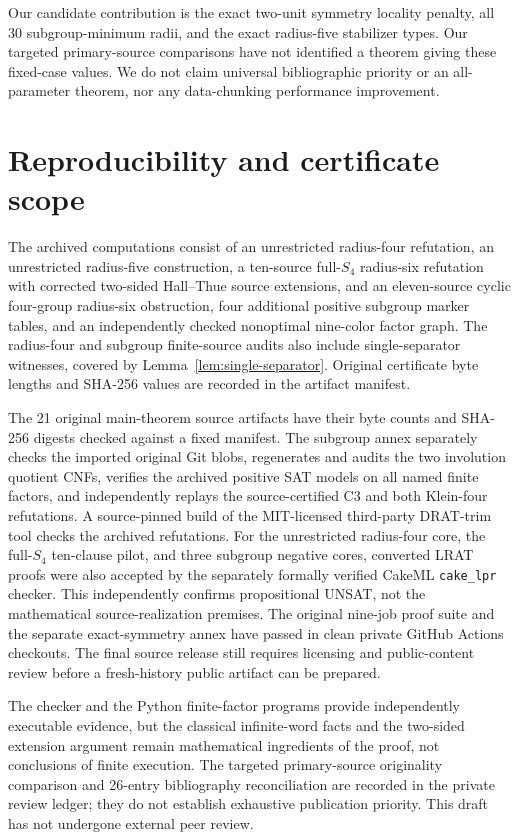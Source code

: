 \documentclass[11pt]{article}
\theoremstyle{remark}
\newcommand{\Sym}{S_4}
\begin{document}
Our candidate contribution is the exact
two-unit symmetry locality penalty,
all 30 subgroup-minimum radii, and
the exact radius-five stabilizer types.
Our targeted primary-source comparisons
have not identified a theorem giving
these fixed-case values. We do not claim
universal bibliographic priority or an
all-parameter theorem, nor any
data-chunking performance improvement.

\section{Reproducibility and certificate scope}

The archived computations consist of an unrestricted
radius-four refutation, an unrestricted radius-five
construction, a ten-source full-$\Sym$ radius-six refutation
with corrected two-sided Hall--Thue source extensions, and
an eleven-source cyclic four-group radius-six
obstruction, four additional positive subgroup
marker tables, and an independently checked
nonoptimal nine-color factor graph. The
radius-four and subgroup finite-source audits also include
single-separator witnesses, covered by
Lemma~\ref{lem:single-separator}. Original
certificate byte lengths and SHA-256 values are recorded in
the artifact manifest.

The 21 original main-theorem source artifacts have their
byte counts and SHA-256 digests checked against a fixed manifest.
The subgroup annex separately checks the imported original Git blobs,
regenerates and audits the two involution quotient CNFs, verifies the
archived positive SAT models on all named finite factors, and
independently replays the source-certified C3 and both Klein-four
refutations. A source-pinned build of the MIT-licensed third-party
DRAT-trim tool checks the archived refutations.
For the unrestricted radius-four core, the full-$S_4$
ten-clause pilot, and three subgroup negative cores,
converted LRAT proofs were also accepted by the
separately formally verified CakeML \texttt{cake\_lpr}
checker. This independently confirms propositional
UNSAT, not the mathematical source-realization
premises. The original nine-job proof suite and the
separate exact-symmetry annex have passed in clean
private GitHub Actions checkouts. The final source
release still requires licensing and public-content
review before a fresh-history public artifact can
be prepared.

The checker and the Python finite-factor programs provide
independently executable evidence, but the classical infinite-word
facts and the two-sided extension argument remain mathematical
ingredients of the proof, not conclusions of finite execution.
The targeted primary-source originality comparison
and 26-entry bibliography reconciliation are recorded
in the private review ledger; they do not establish
exhaustive publication priority. This draft has not
undergone external peer review.
\end{document}
